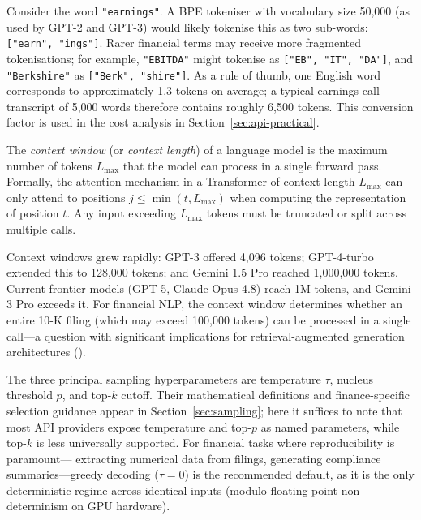 \begin{context}
\begin{example}
\label{ex:bpe}
Consider the word \texttt{"earnings"}.  A BPE tokeniser with vocabulary size 50,000
(as used by GPT-2 and GPT-3) would likely tokenise this as two sub-words:
\texttt{["earn", "ings"]}.  Rarer financial terms may receive more fragmented
tokenisations; for example, \texttt{"EBITDA"} might tokenise as
\texttt{["EB",\,"IT",\,"DA"]}, and \texttt{"Berkshire"} as
\texttt{["Berk",\,"shire"]}.  As a rule of thumb, one English word corresponds to
approximately 1.3 tokens on average; a typical earnings call transcript of 5,000 words
therefore contains roughly 6,500 tokens.  This conversion factor is used in the cost
analysis in Section~\ref{sec:api-practical}.
\end{example}

\begin{definition}
\label{def:context-window}
The \emph{context window} (or \emph{context length}) of a language model is the
maximum number of tokens $L_{\max}$ that the model can process in a single forward
pass.  Formally, the attention mechanism in a Transformer of context length $L_{\max}$
can only attend to positions $j \leq \min(t, L_{\max})$ when computing the
representation of position $t$.  Any input exceeding $L_{\max}$ tokens must be
truncated or split across multiple calls.
\end{definition}

Context windows grew rapidly: GPT-3 offered 4,096 tokens; GPT-4-turbo extended
this to 128,000 tokens; and Gemini 1.5 Pro reached 1,000,000 tokens.  Current frontier
models (GPT-5, Claude Opus 4.8) reach 1M tokens, and Gemini 3 Pro exceeds it.  For
financial NLP, the context window determines whether an entire 10-K filing (which may
exceed 100,000 tokens) can be processed in a single call---a question with significant
implications for retrieval-augmented generation architectures ().

The three principal sampling hyperparameters are temperature $\tau$, nucleus threshold
$p$, and top-$k$ cutoff.  Their mathematical definitions and finance-specific selection
guidance appear in Section~\ref{sec:sampling}; here it suffices to note that most API
providers expose temperature and top-$p$ as named parameters, while top-$k$ is less
universally supported.  For financial tasks where reproducibility is paramount---
extracting numerical data from filings, generating compliance summaries---greedy
decoding ($\tau = 0$) is the recommended default, as it is the only deterministic
regime across identical inputs (modulo floating-point non-determinism on GPU hardware).


\end{context}
